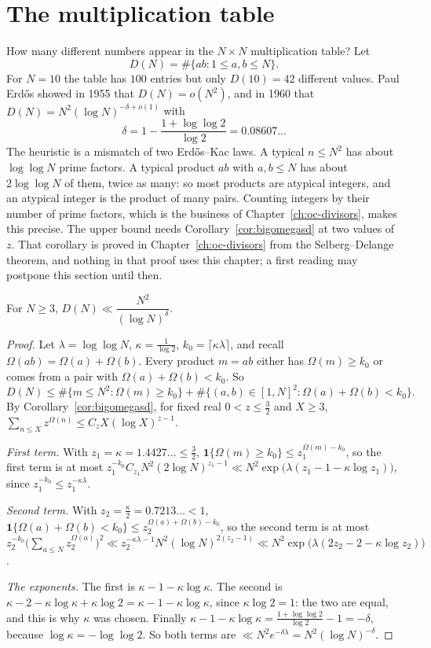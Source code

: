 \section{The multiplication table}\label{sec:table}

How many different numbers appear in the $N\times N$ multiplication table? Let
\[
D(N)=\#\{ab:1\le a,b\le N\}.
\]
For $N=10$ the table has $100$ entries but only $D(10)=42$ different values. Paul Erd\H{o}s showed in 1955 that $D(N)=o(N^2)$, and in 1960 that $D(N)=N^2(\log N)^{-\delta+o(1)}$ with
\[
\delta=1-\frac{1+\log\log2}{\log2}=0.08607\ldots
\]
The heuristic is a mismatch of two Erd\H{o}s--Kac laws. A typical $n\le N^2$ has about $\log\log N$ prime factors. A typical product $ab$ with $a,b\le N$ has about $2\log\log N$ of them, twice as many: so most products are atypical integers, and an atypical integer is the product of many pairs. Counting integers by their number of prime factors, which is the business of Chapter~\ref{ch:oc-divisors}, makes this precise. The upper bound needs Corollary~\ref{cor:bigomegasd} at two values of $z$. That corollary is proved in Chapter~\ref{ch:oc-divisors} from the Selberg--Delange theorem, and nothing in that proof uses this chapter; a first reading may postpone this section until then.

\begin{theorem}[Erd\H{o}s, 1960]\label{thm:multtable}
For $N\ge3$, $D(N)\ll\dfrac{N^2}{(\log N)^\delta}$.
\end{theorem}
\begin{proof}
Let $\lambda=\log\log N$, $\kappa=\frac1{\log2}$, $k_0=\lceil\kappa\lambda\rceil$, and recall $\Omega(ab)=\Omega(a)+\Omega(b)$. Every product $m=ab$ either has $\Omega(m)\ge k_0$ or comes from a pair with $\Omega(a)+\Omega(b)<k_0$. So
\[
D(N)\le\#\{m\le N^2:\Omega(m)\ge k_0\}+\#\{(a,b)\in[1,N]^2:\Omega(a)+\Omega(b)<k_0\}.
\]
By Corollary~\ref{cor:bigomegasd}, for fixed real $0<z\le\frac32$ and $X\ge3$, $\sum_{n\le X}z^{\Omega(n)}\le C_zX(\log X)^{z-1}$.

\emph{First term.} With $z_1=\kappa=1.4427\ldots\le\frac32$, $\mathbf 1\{\Omega(m)\ge k_0\}\le z_1^{\Omega(m)-k_0}$, so the first term is at most $z_1^{-k_0}C_{z_1}N^2(2\log N)^{z_1-1}\ll N^2\exp\bigl(\lambda(z_1-1-\kappa\log z_1)\bigr)$, since $z_1^{-k_0}\le z_1^{-\kappa\lambda}$.

\emph{Second term.} With $z_2=\frac\kappa2=0.7213\ldots<1$, $\mathbf 1\{\Omega(a)+\Omega(b)<k_0\}\le z_2^{\Omega(a)+\Omega(b)-k_0}$, so the second term is at most $z_2^{-k_0}\bigl(\sum_{a\le N}z_2^{\Omega(a)}\bigr)^2\ll z_2^{-\kappa\lambda-1}N^2(\log N)^{2(z_2-1)}\ll N^2\exp\bigl(\lambda(2z_2-2-\kappa\log z_2)\bigr)$.

\emph{The exponents.} The first is $\kappa-1-\kappa\log\kappa$. The second is $\kappa-2-\kappa\log\kappa+\kappa\log2=\kappa-1-\kappa\log\kappa$, since $\kappa\log2=1$: the two are equal, and this is why $\kappa$ was chosen. Finally $\kappa-1-\kappa\log\kappa=\frac{1+\log\log2}{\log2}-1=-\delta$, because $\log\kappa=-\log\log2$. So both terms are $\ll N^2e^{-\delta\lambda}=N^2(\log N)^{-\delta}$.
\end{proof}

